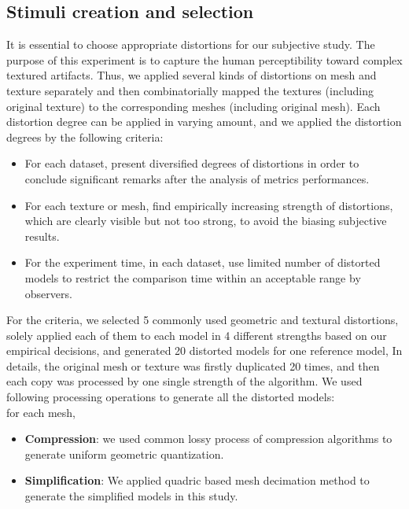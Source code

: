 \subsection{Stimuli creation and selection}
It is essential to choose appropriate distortions for our subjective study.  The purpose of this experiment is to capture the human perceptibility toward complex textured artifacts. Thus, we applied several kinds of distortions on mesh and texture separately and then combinatorially mapped the textures (including original texture) to the corresponding meshes (including original mesh). Each distortion degree can be applied in varying amount, and we applied the distortion degrees by the following criteria: \\
\begin{itemize}
\item For each dataset, present diversified degrees of distortions in order to conclude significant remarks after the analysis of metrics performances. 
\end{itemize}
\begin{itemize}
\item For each texture or mesh, find empirically increasing strength of distortions, which are clearly visible but not too strong, to avoid the biasing subjective results.
\end{itemize}
\begin{itemize}
\item For the experiment time, in each dataset, use limited number of distorted models to restrict the comparison time within an acceptable range by observers. 
\end{itemize}
For the criteria, we selected 5 commonly used geometric and textural distortions, solely applied each of them to each model in 4 different strengths based on our empirical decisions, and generated 20 distorted models for one reference model, In details, the original mesh or texture was firstly duplicated 20 times, and then each copy was processed by one single strength of the algorithm. We used following processing operations to generate all the distorted models:\\
for each mesh,
\begin{itemize}
\item \textbf{Compression}:  we used common lossy process of  compression algorithms to generate uniform geometric quantization.
\end{itemize}
\begin{itemize}
\item  \textbf{Simplification}: We applied quadric based mesh decimation method \cite{Garland_1997} to generate the simplified models in this study.
\end{itemize}
